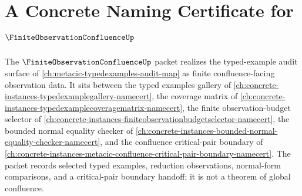 \chapter{A Concrete Naming Certificate for $\FiniteObservationConfluenceUp$}
\label{ch:concrete-instances-finite-observation-confluence-namecert}

The $\FiniteObservationConfluenceUp$ packet realizes the typed-example audit surface of \autoref{ch:metacic-typedexamples-audit-map} as finite confluence-facing observation data. It sits between the typed examples gallery of \autoref{ch:concrete-instances-typedexamplegallery-namecert}, the coverage matrix of \autoref{ch:concrete-instances-typedexamplecoveragematrix-namecert}, the finite observation-budget selector of \autoref{ch:concrete-instances-finiteobservationbudgetselector-namecert}, the bounded normal equality checker of \autoref{ch:concrete-instances-bounded-normal-equality-checker-namecert}, and the confluence critical-pair boundary of \autoref{ch:concrete-instances-metacic-confluence-critical-pair-boundary-namecert}. The packet records selected typed examples, reduction observations, normal-form comparisons, and a critical-pair boundary handoff; it is not a theorem of global confluence.




